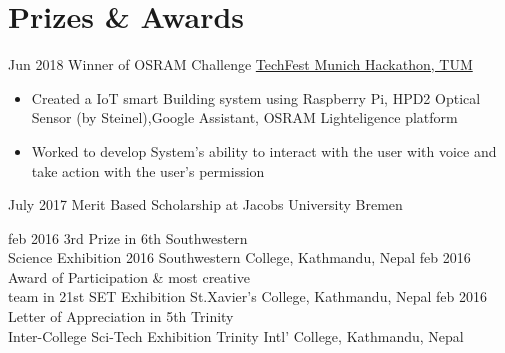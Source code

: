 \documentclass[letterpaper]{twentysecondcv} %
\begin{document}
\section{Prizes \& Awards}
\begin{twenty}
    \twentyitem
        {Jun 2018}
		{}
        {Winner of OSRAM Challenge}
        {\href{https://www.techfestmunich.com/2018}{TechFest Munich Hackathon, TUM}}
        {}
        {
        {\begin{itemize}
        \item Created a IoT smart Building system using Raspberry Pi, HPD2 Optical Sensor (by Steinel),Google Assistant, OSRAM Lighteligence platform
        \item Worked to develop System's ability to interact with the user with voice and take action with the user's permission\\
         
        \end{itemize}}
        }
        
     \twentyitem
        {July 2017}
		{}
        {Merit Based Scholarship at Jacobs University Bremen}
        {}
        {}
        {
        }
        
    \twentyitem
        {feb 2016}
		{}
        {3rd Prize in 6th Southwestern \\Science Exhibition 2016 }
        {Southwestern College, Kathmandu, Nepal}
        {}
        {
        }
     \twentyitem
        {feb 2016}
		{}
        {Award of Participation \& most creative \\team in 21st SET Exhibition}
        {St.Xavier's College, Kathmandu, Nepal}
        {}
        {
        }
        \twentyitem
        {feb 2016}
		{}
        {Letter of Appreciation in 5th Trinity \\ Inter-College Sci-Tech Exhibition}
        {Trinity Intl' College, Kathmandu, Nepal}
        {}
        {
        }
\end{twenty}
\end{document}
